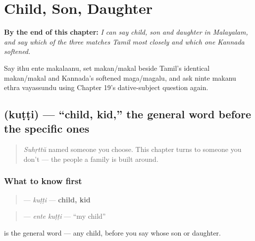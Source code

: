 
\chapter{Child, Son, Daughter}
\label{ch:ml-child-son-daughter}

\begin{chapteropening}
\textbf{By the end of this chapter:} \emph{I can say child, son and daughter in Malayalam, and say which of the three matches Tamil most closely and which one Kannada softened.}

Say ithu ente makalaanu, set makan/makal beside Tamil's identical makan/makal and Kannada's softened maga/magalu, and ask ninte makanu ethra vayassundu using Chapter 19's dative-subject question again.
\end{chapteropening}

\section[\texorpdfstring{\ml{കുട്ടി} (kuṭṭi)}{കുട്ടി (kuṭṭi)}]{ (kuṭṭi) — \textquotedblleft{}child, kid,\textquotedblright{} the general word before the specific ones}

\label{lesson:ML-C36-kutti}



\begin{quote}
\emph{Suhṛttŭ} named someone you choose. This chapter turns to someone you don't — the people a family is built around.
\end{quote}

\subsection*{What to know first}
\begin{quote}
\textbf{} — \emph{kuṭṭi} — \textbf{child, kid}
\end{quote}

\begin{quote}
\textbf{ } — \emph{ente kuṭṭi} — \textquotedblleft{}my child\textquotedblright{}
\end{quote}

\textbf{} is the general word — any child, before you say whose son or daughter.


